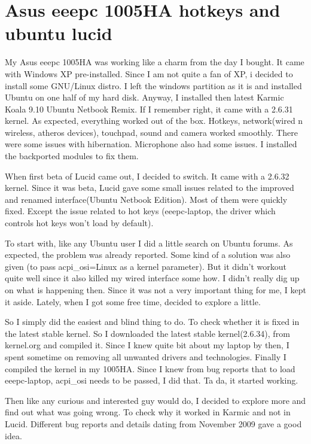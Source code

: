 \section*{Asus eeepc 1005HA hotkeys and ubuntu lucid}
\vskip 2pt

My Asus eeepc 1005HA was working like a charm from the day I bought. It came with Windows XP pre-installed. Since I am not quite a fan of XP, i decided to install some GNU/Linux distro. I left the windows partition as it is and installed Ubuntu on one half of my hard disk. Anyway, I installed then latest Karmic Koala 9.10 Ubuntu Netbook Remix. If I remember right, it came with a 2.6.31 kernel. As expected, everything worked out of the box. Hotkeys, network(wired n wireless, atheros devices), touchpad, sound and camera worked smoothly. There were some issues with hibernation. Microphone also had some issues. I installed the backported modules to fix them.

When first beta of Lucid came out, I decided to switch. It came with a 2.6.32 kernel. Since it was beta, Lucid gave some small issues related to the improved and renamed interface(Ubuntu Netbook Edition). Most of them were quickly fixed. Except the issue related to hot keys (eeepc-laptop, the driver which controls hot keys won’t load by default).

To start with, like any Ubuntu user I did a little search on Ubuntu forums. As expected, the problem was already reported. Some kind of a solution was also given (to pass acpi_osi=Linux as a kernel parameter). But it didn’t workout quite well since it also killed my wired interface some how. I didn’t really dig up on what is happening then. Since it was not a very important thing for me, I kept it aside. Lately, when I got some free time, decided to explore a little.

So I simply did the easiest and blind thing to do. To check whether it is fixed in the latest stable kernel. So I downloaded the latest stable kernel(2.6.34), from kernel.org and compiled it. Since I knew quite bit about my laptop by then, I spent sometime on removing all unwanted drivers and technologies. Finally I compiled the kernel in my 1005HA. Since I knew from bug reports that to load eeepc-laptop, acpi_osi needs to be passed, I did that. Ta da,  it started working.

Then like any curious and interested guy would do, I decided to explore more and find out what was going wrong. To check why it worked in Karmic and not in Lucid. Different bug reports and details dating from November 2009 gave a good idea.

